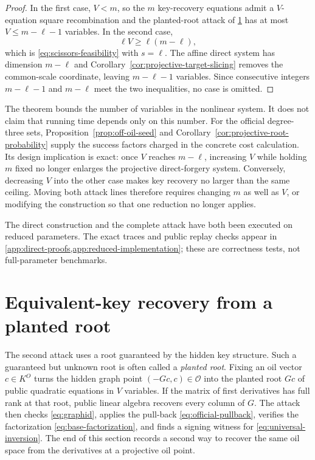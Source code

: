 \documentclass[11pt,a4paper]{article}
\theoremstyle{definition}
\theoremstyle{remark}
\newcommand{\cO}{\mathcal O}
\begin{document}
\begin{proof}
In the first case, $V<m$, so the $m$ key-recovery equations admit a
$V$-equation square recombination and the planted-root attack of
\cref{sec:recovery} has at most $V\le m-\ell-1$ variables.  In the second case,
\[
 \ell V\ge\ell(m-\ell),
\]
which is \eqref{eq:scissors-feasibility} with $s=\ell$.  The affine direct
system has dimension $m-\ell$ and
Corollary~\ref{cor:projective-target-slicing} removes the common-scale
coordinate, leaving $m-\ell-1$ variables.  Since consecutive integers
$m-\ell-1$ and $m-\ell$ meet the
two inequalities, no case is omitted.
\end{proof}

The theorem bounds the number of variables in the nonlinear system.  It does
not claim that running time depends only on this number.  For the official degree-three sets,
Proposition~\ref{prop:off-oil-seed} and
Corollary~\ref{cor:projective-root-probability} supply the success
factors charged in the concrete cost calculation.  Its design implication is exact:
once $V$ reaches $m-\ell$, increasing $V$ while holding $m$ fixed no longer
enlarges the projective direct-forgery system.  Conversely, decreasing $V$ into
the other case makes key recovery no larger than the same ceiling.
Moving both attack lines therefore requires changing $m$ as well as $V$, or
modifying the construction so that one reduction no longer applies.

The direct construction and the complete attack have both
been executed on reduced parameters.  The exact traces and public replay
checks appear in \cref{app:direct-proofs,app:reduced-implementation}; these are
correctness tests, not full-parameter benchmarks.

\section{Equivalent-key recovery from a planted root}\label{sec:recovery}

The second attack uses a root guaranteed by the hidden key structure.  Such a
guaranteed but unknown root is often called a \emph{planted root}.  Fixing an
oil vector $c\in K^O$ turns the hidden graph point
$(-Gc,c)\in\cO$ into the planted root $Gc$ of public quadratic equations in
$V$ variables.  If the matrix of first derivatives has full rank at that root,
public linear algebra recovers every column of $G$.  The attack then checks
\eqref{eq:graphid}, applies the pull-back \eqref{eq:official-pullback}, verifies
the factorization \eqref{eq:base-factorization}, and finds a signing witness
for \eqref{eq:universal-inversion}.  The end of this section records a second
way to recover the same oil space from the derivatives at a projective oil
point.
\end{document}

